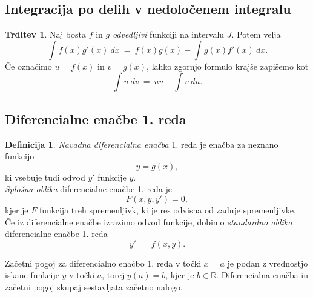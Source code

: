 \documentclass[11pt]{article}
\theoremstyle{definition}
\newtheorem{definicija}{Definicija}[section]
\theoremstyle{definition}
\newtheorem{trditev}{Trditev}[section]
\theoremstyle{definition}
\theoremstyle{theorem}
\begin{document}
\subsection{Integracija po delih v nedoločenem integralu}
\vspace{0.5cm}

\begin{trditev}

Naj bosta $f$ in $g$ \textit{odvedljivi} funkciji na intervalu $J$. Potem velja
$$\int f(x) g'(x)~dx ~=~ f(x) g(x) - \int g(x) f'(x)~dx.$$
Če označimo $u = f(x)$ in $v = g(x)$, lahko zgornjo formulo krajše zapišemo kot
$$\int u~dv ~=~ uv - \int v~du.$$

\end{trditev}
\vspace{0.5cm}

\pagebreak


\subsection{Diferencialne enačbe 1. reda}
\vspace{0.5cm}

\begin{definicija}

\textit{Navadna diferencialna enačba} 1. reda je enačba za neznano funkcijo 
$$y=g(x),$$
ki vsebuje tudi odvod $y'$ funkcije $y$. \\

\noindent \textit{Splošna oblika} diferencialne enačbe 1. reda je
$$F(x,y,y')=0,$$
kjer je $F$ funkcija treh spremenljivk, ki je res odvisna od zadnje spremenljivke. \\

\noindent Če iz diferencialne enačbe izrazimo odvod funkcije, dobimo \textit{standardno obliko} diferencialne enačbe 1. reda
$$y' ~=~ f(x,y).$$

\noindent Začetni pogoj za diferencialno enačbo 1. reda v točki $x = a$ je podan z vrednostjo iskane funkcije $y$ v točki $a$, torej $y(a) = b$, kjer je $b \in \mathbb{R}$. Diferencialna enačba in začetni pogoj skupaj sestavljata začetno nalogo.

\end{definicija}
\vspace{0.5cm}
\end{document}
